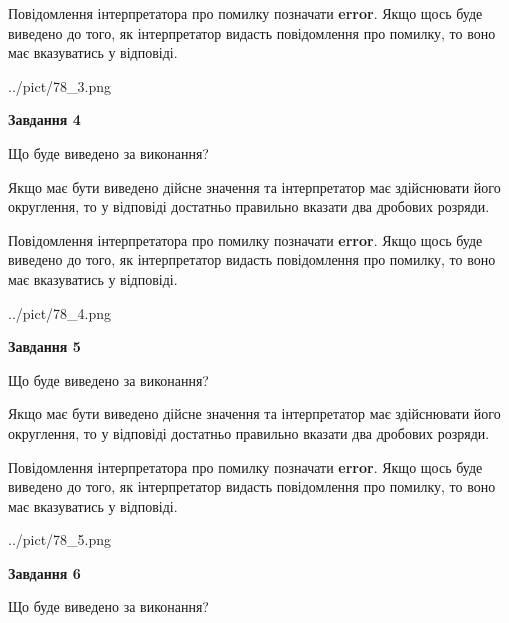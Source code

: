 \documentclass[12pt, ukrainian]{article}
\begin{document}
{\begin {Large}
Повідомлення інтерпретатора про помилку позначати \textbf{error}.
Якщо щось буде виведено до того, як інтерпретатор видасть повідомлення про помилку, 
то воно має вказуватись у відповіді. \par

\begin{center}
	{../pict/78_3.png}
\end{center}
\newpage

{\begin {center}\textbf{Завдання 4}\end {center}}\par
Що буде виведено за виконання? \par

Якщо має бути виведено дійсне значення та інтерпретатор має здійснювати його округлення, 
то у відповіді достатньо правильно вказати два дробових розряди.

Повідомлення інтерпретатора про помилку позначати \textbf{error}.
Якщо щось буде виведено до того, як інтерпретатор видасть повідомлення про помилку, 
то воно має вказуватись у відповіді. \par

\begin{center}
	{../pict/78_4.png}
\end{center}
\newpage

{\begin {center}\textbf{Завдання 5}\end {center}}\par
Що буде виведено за виконання? \par

Якщо має бути виведено дійсне значення та інтерпретатор має здійснювати його округлення, 
то у відповіді достатньо правильно вказати два дробових розряди.

Повідомлення інтерпретатора про помилку позначати \textbf{error}.
Якщо щось буде виведено до того, як інтерпретатор видасть повідомлення про помилку, 
то воно має вказуватись у відповіді. \par

\begin{center}
	{../pict/78_5.png}
\end{center}
\newpage

{\begin {center}\textbf{Завдання 6}\end {center}}\par
Що буде виведено за виконання? \par


\end{Large}}
\end{document}
